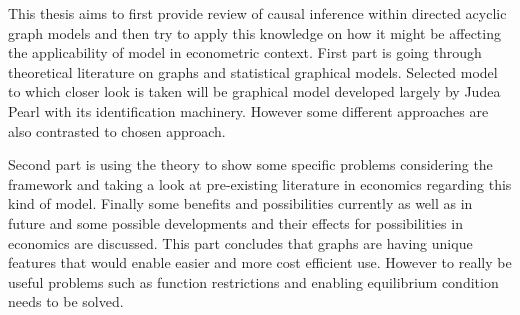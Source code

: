 \documentclass[main=english,12pt,a4paper,pdftex,econ,utf8]{aaltothesis}
\begin{document}
\makecoverpage



\begin{abstractpage}[english]
This thesis aims to first provide review of causal inference within directed acyclic graph models and then try to apply this knowledge on how it might be affecting the applicability of model in econometric context. First part is going through theoretical literature on graphs and statistical graphical models. Selected model to which closer look is taken will be graphical model developed largely by Judea Pearl with its identification machinery. However some different approaches are also contrasted to chosen approach.

Second part is using the theory to show some specific problems considering the framework and taking a look at pre-existing literature in economics regarding this kind of model. Finally some benefits and possibilities currently as well as in future and some possible developments and their effects for possibilities in economics are discussed. This part concludes that graphs are having unique features that would enable easier and more cost efficient use. However to really be useful problems such as function restrictions and enabling equilibrium condition needs to be solved.
\begin{comment}
Your abstract in English. Try to keep the abstract short; approximately 
100 words should be enough. The abstract explains your research topic, 
the methods you have used, and the results you obtained.  
Your abstract in English. Try to keep the abstract short; approximately 
100 words should be enough. The abstract explains your research topic, 
the methods you have used, and the results you obtained.  

Your abstract in English. Try to keep the abstract short; approximately 
100 words should be enough. The abstract explains your research topic, 
the methods you have used, and the results you obtained.  
Your abstract in English. Try to keep the abstract short; approximately 
100 words should be enough. The abstract explains your research topic, 
the methods you have used, and the results you obtained.  
\end{comment}    
\end{abstractpage}
\end{document}

